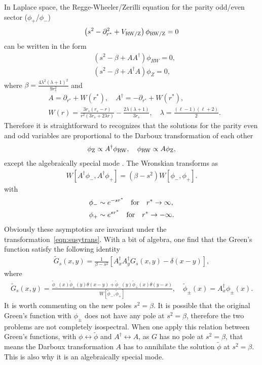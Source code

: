 \documentclass[reprint,aps,physrev,superscriptaddress,10pt,notitlepage,prd,nofootinbib,onecolumn]{revtex4-2}
\begin{document}
In Laplace space, the Regge-Wheeler/Zerilli equation for the parity odd/even sector ($\phi_+$/$\phi_-$) 
\begin{align} \label{eqn:laplRWZeqn}
   \left( s^2 -\partial_{r^*}^2 + V_{\rm RW/Z}\right)\phi_{\rm RW/Z} =0
\end{align}
can be written in the form 
\begin{align}
   &\left( s^2 - \beta + A A^\dagger \right) \phi_{RW} =0, \nonumber \\
   & \left( s^2 - \beta + A^\dagger A \right) \phi_{Z} =0,
\end{align}
where $\beta = \frac{4\lambda^2(\lambda+1)^2}{9r_s^2}$ and 
\begin{align}
   & A = \partial_{r^*}+W(r^*), \quad  A^\dagger = -\partial_{r^*}+W(r^*), \nonumber \\
   & W(r) = \frac{3 r_s(r_s-r) }{r^2 (3r_s + 2\lambda r)} - \frac{2\lambda(\lambda+1)}{3r_s} , \quad \lambda= \frac{(\ell -1)(\ell+2)}{2}.
\end{align}
Therefore it is straightforward to recognizes that the solutions for the parity even and odd variables are proportional to the Darboux transformation of each other 
\begin{align} \label{eqn:susytrans}
    \phi_{\rm Z} \propto A^\dagger \phi_{\rm RW}, \quad \phi_{\rm RW} \propto A \phi_{\rm Z} ,
\end{align}
except the algebraically special mode \cite{Chandrasekhar:1984mgh}. The Wronskian transforms as 
\begin{align}
    W[A^\dagger \phi_-, A^\dagger \phi_+] = (\beta -s^2)W[\phi_-,  \phi_+] .
\end{align}
with 
\begin{align}
    \phi_- & \sim e^{-sr^*}  \quad   {\rm for } \quad  r^* \to \infty , \nonumber \\
    \phi_+ &\sim e^{sr^*}  \quad   {\rm for } \quad  r^* \to -\infty .
\end{align}
Obviously these asymptotics are invariant under the transformation~\eqref{eqn:susytrans}. With a bit of algebra, one find that the Green's function satisfy the following identity
\begin{align}
    \tilde{G}_s(x,y) = \frac{1}{\beta-s^2}[A^\dagger_x A^\dagger_y G_s(x,y)-\delta(x-y)],
\end{align}
where
\begin{align}
    \tilde{G}_s(x,y) = \frac{\tilde{\phi}_-(x)\tilde{\phi}_+(y)\theta(x-y)+\tilde{\phi}_-(y)\tilde{\phi}_+(x)\theta(y-x)}{W[\tilde{\phi}_-,\tilde{\phi}_+]}, \quad 
    \tilde{\phi}_{\pm}(x) = A^{\dagger}_x\phi_{\pm}(x) . 
\end{align}
It is worth commenting on the new poles $s^2 =\beta$. It is possible that the original Green's function with $\phi_{\pm}$ does not have any pole at  $s^2 =\beta$, therefore the two problems are not completely isospectral. When one apply this relation between Green's functions, with $\phi \leftrightarrow \tilde{\phi}$  and $A^\dagger \leftrightarrow A$, as $G$ has no pole at $s^2 =\beta$, that means the Darboux transformation $A$ has to annihilate the solution $\tilde{\phi}$ at  $s^2 =\beta$. This is also why it is an algebraically special mode.
 
\end{document}
